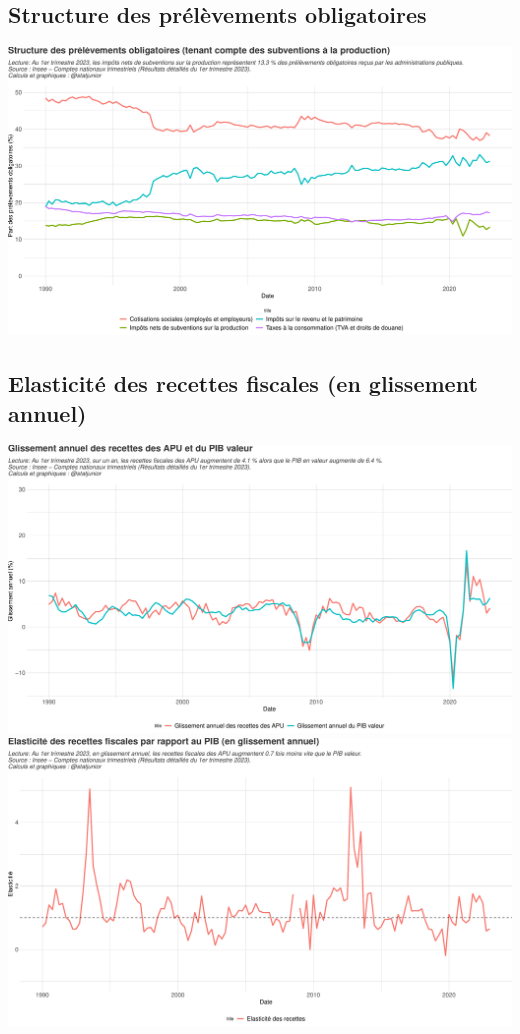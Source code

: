 \documentclass[
  paper=a4,
  ,captions=tableheading
]{scrartcl}
\begin{document}
\hypertarget{structure-des-pruxe9luxe8vements-obligatoires}{%
\subsection{Structure des prélèvements
obligatoires}\label{structure-des-pruxe9luxe8vements-obligatoires}}

\includegraphics{rapport_pdf_csi_files/figure-latex/unnamed-chunk-11-1.pdf}

\hypertarget{elasticituxe9-des-recettes-fiscales-en-glissement-annuel}{%
\subsection{Elasticité des recettes fiscales (en glissement
annuel)}\label{elasticituxe9-des-recettes-fiscales-en-glissement-annuel}}

\includegraphics{rapport_pdf_csi_files/figure-latex/unnamed-chunk-12-1.pdf}
\includegraphics{rapport_pdf_csi_files/figure-latex/unnamed-chunk-13-1.pdf}
\end{document}
